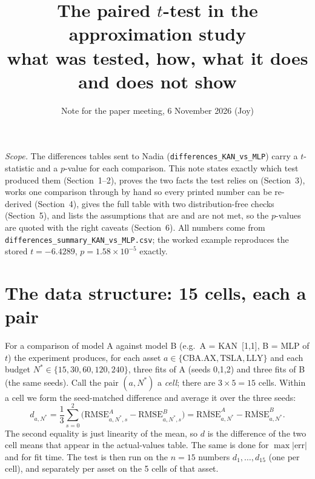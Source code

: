\documentclass[11pt,a4paper]{article}
\title{\vspace{-1.2cm}The paired $t$-test in the approximation study\\[2pt]\large what was tested, how, what it does and does not show}
\author{Note for the paper meeting, 6 November 2026 (Joy)}
\date{}
\begin{document}
\maketitle
\vspace{-0.9cm}
\noindent\textit{Scope.} The differences tables sent to Nadia (\texttt{differences\_KAN\_vs\_MLP}) carry a $t$-statistic and a $p$-value for each comparison. This note states exactly which test produced them (Section~1--2), proves the two facts the test relies on (Section~3), works one comparison through by hand so every printed number can be re-derived (Section~4), gives the full table with two distribution-free checks (Section~5), and lists the assumptions that are and are not met, so the $p$-values are quoted with the right caveats (Section~6). All numbers come from \texttt{differences\_summary\_KAN\_vs\_MLP.csv}; the worked example reproduces the stored $t=-6.4289$, $p=1.58\times10^{-5}$ exactly.

\section{The data structure: 15 cells, each a pair}
For a comparison of model A against model B (e.g.\ A = KAN~[1,1], B = MLP of $t$) the experiment produces, for each asset $a\in\{\text{CBA.AX},\text{TSLA},\text{LLY}\}$ and each budget $N^*\in\{15,30,60,120,240\}$, three fits of A (seeds 0,1,2) and three fits of B (the same seeds). Call the pair $(a,N^*)$ a \emph{cell}; there are $3\times5=15$ cells. Within a cell we form the seed-matched difference and average it over the three seeds:
\begin{equation}
d_{a,N^*}=\frac13\sum_{s=0}^{2}\bigl(\mathrm{RMSE}^{A}_{a,N^*,s}-\mathrm{RMSE}^{B}_{a,N^*,s}\bigr)
=\overline{\mathrm{RMSE}}^{A}_{a,N^*}-\overline{\mathrm{RMSE}}^{B}_{a,N^*}.
\label{eq:d}
\end{equation}
The second equality is just linearity of the mean, so $d$ is the difference of the two cell means that appear in the actual-values table. The same is done for $\max|\mathrm{err}|$ and for fit time. The test is then run on the $n=15$ numbers $d_1,\dots,d_{15}$ (one per cell), and separately per asset on the 5 cells of that asset.
\end{document}
